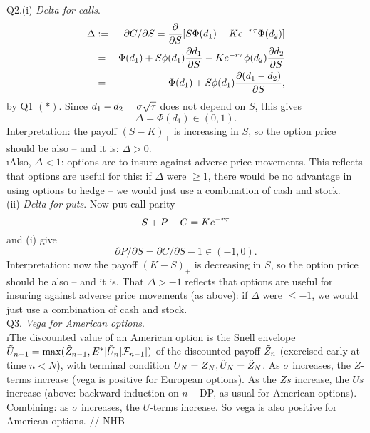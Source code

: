 \documentclass[12pt]{article}
\begin{document}
\ni Q2.(i)  {\it Delta for calls}.
\begin{eqnarray*}
\Delta
&:=& \partial C/\partial S = \frac{\partial}{\partial S}[S \Phi(d_1) - K e^{-r \tau} \Phi(d_2)] \\
&=& \Phi(d_1) + S \phi(d_1) \frac{\partial d_1}{\partial S} - K e^{-r \tau} \phi(d_2) \frac{\partial d_2}{\partial S} \\
&=& \Phi(d_1) + S \phi(d_1) \frac{\partial (d_1 - d_2)}{\partial S},
\end{eqnarray*}
by Q1 $(\ast)$.  Since $d_1 - d_2 = \sigma \sqrt{\tau}$ does not depend on $S$, this gives
$$
\Delta = \Phi(d_1) \in (0,1).
$$
Interpretation: the payoff $(S-K)_+$ is increasing in $S$, so the option price should be also -- and it is: $\Delta > 0$. \\
\i Also, $\Delta < 1$: options are to insure against adverse price movements.  This reflects that options are useful for this: if $\Delta$ were $\geq 1$, there would be no advantage in using options to hedge -- we would just use a combination of cash and stock. \\
(ii) {\it Delta for puts}.  Now put-call parity
$$
S + P - C = K e^{-r \tau}
$$
and (i) give
$$
\partial P/\partial S =  \partial C/\partial S - 1  \in (-1,0).
$$
Interpretation: now the payoff $(K-S)_+$ is decreasing in $S$, so the option price should be also -- and it is.  That $\Delta > -1$ reflects that options are useful for insuring against adverse price movements (as above): if $\Delta$ were $\leq -1$, we would just use a combination of cash and stock.  \\

\ni Q3.  {\it Vega for American options}.  \\
\i The discounted value of an American option is the Snell envelope $\tilde U_{n-1} = \max(\tilde Z_{n-1}, E^*[\tilde U_n \vert {\mathcal{F}}_{n-1}])$ of the discounted payoff $\tilde Z_n$ (exercised early at time $n < N$), with terminal condition $U_N = Z_N, \tilde U_N = \tilde Z_N$.  As $\sigma$ increases, the $Z$-terms increase (vega is positive for European options).  As the $Zs$ increase, the $Us$ increase (above: backward induction on $n$ -- DP, as usual for American options).  Combining: as $\sigma$ increases, the $U$-terms increase.  So vega is also positive for American options. // \hfil NHB \break
\end{document}
